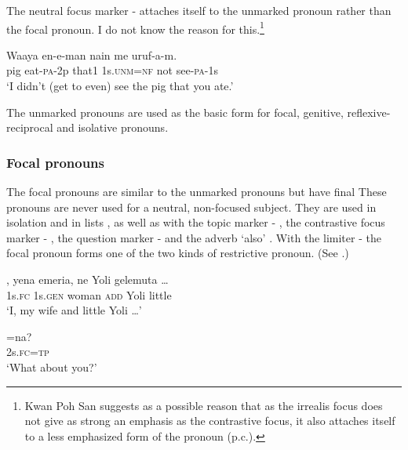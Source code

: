 The neutral focus marker - attaches itself to the unmarked pronoun rather than the focal pronoun. I do not know the reason for this.\footnote{Kwan Poh San suggests as a possible reason that as the irrealis focus does not give as strong an emphasis as the contrastive focus, it also attaches itself to a less emphasized form of the pronoun (p.c.).}

\ea%
\label{ex:3:x547}
\gll Waaya en-e-man nain  me uruf-a-m. \\
pig eat-\textsc{pa}-2p that1 1s.\textsc{unm}=\textsc{nf} not see-\textsc{pa}-1s \\
\glt`I didn't (get to even) see the pig that you ate.'
\z

The unmarked pronouns are used as the basic form for focal, genitive, reflexive-reciprocal and isolative pronouns.

\subsubsection{Focal pronouns}\label{sec:3:z:y:x}
{}
The focal pronouns are similar to the unmarked pronouns but have final  These pronouns are never used for a neutral, non-focused subject. They are used in isolation and in lists , as well as with the topic marker - , the contrastive focus marker - , the question marker -  and the adverb  `also' . With the limiter -  the focal pronoun forms one of the two kinds of restrictive pronoun. (See .)

\ea%
\label{ex:3:x541}
\gll {}, yena emeria, ne Yoli gelemuta {\dots} \\
1s.\textsc{fc} 1s.\textsc{gen} woman \textsc{add} Yoli little\\
\glt`I, my wife and little Yoli {\dots}'
\z

\ea%
\label{ex:3:x542}
\gll {}=na? \\
2s.\textsc{fc}=\textsc{tp}\\
\glt`What about you?'
\z

